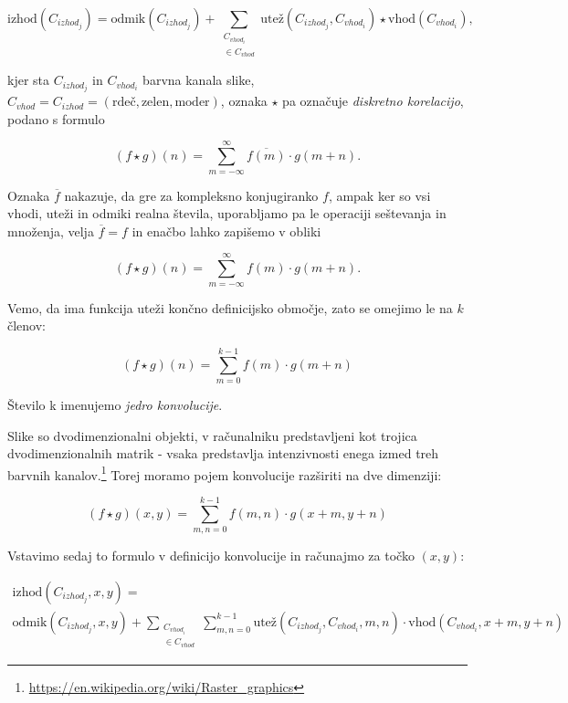 \documentclass[a4paper,11pt,titlepage]{article}
\begin{document}
\begin{equation*}
\text{izhod}(C_{izhod_j}) =
	\text{odmik}(C_{izhod_j}) + \sum_{\substack{C_{vhod_i} \\ \in C_{vhod}}} \text{utež}(C_{izhod_j}, C_{vhod_i}) \star \text{vhod}(C_{vhod_i}) \text{,}
\end{equation*}

kjer sta $C_{izhod_j}$ in $C_{vhod_i}$ barvna kanala slike, $C_{vhod} = C_{izhod} = (\text{rdeč}, \text{zelen}, \text{moder})$,
	oznaka $\star$ pa označuje \emph{diskretno korelacijo}, podano s formulo

\begin{equation*}
(f\star g) (n) = \sum_{m = - \infty}^{\infty} \overline{f(m)} \cdot g(m + n) \text{.}
\end{equation*}

Oznaka $\overline{f}$ nakazuje, da gre za kompleksno konjugiranko $f$, ampak ker so vsi vhodi, uteži in odmiki realna števila,
	uporabljamo pa le operaciji seštevanja in množenja, velja $\overline{f} = f$ in enačbo lahko zapišemo v obliki

\begin{equation*}
(f\star g) (n) = \sum_{m = - \infty}^{\infty} f(m) \cdot g(m + n) \text{.}
\end{equation*}

Vemo, da ima funkcija uteži končno definicijsko območje, zato se omejimo le na $k$ členov:

\begin{equation*}
(f\star g) (n) = \sum_{m = 0}^{k - 1} f(m) \cdot g(m + n)
\end{equation*}

Število k imenujemo \emph{jedro konvolucije}.

Slike so dvodimenzionalni objekti, v računalniku predstavljeni kot trojica dvodimenzionalnih matrik - vsaka predstavlja intenzivnosti
	enega izmed treh barvnih kanalov.\footnote{\url{https://en.wikipedia.org/wiki/Raster\_graphics}}
Torej moramo pojem konvolucije razširiti na dve dimenziji:

\begin{equation*}
(f\star g) (x, y) = \sum_{m, n = 0}^{k - 1} f(m, n) \cdot g(x + m, y + n)
\end{equation*}

Vstavimo sedaj to formulo v definicijo konvolucije in računajmo za točko $(x, y)$:

\begin{multline*}
\text{izhod}(C_{izhod_j}, x, y) = \\
	\text{odmik}(C_{izhod_j}, x, y) + \sum_{\substack{C_{vhod_i} \\ \in C_{vhod}}} \sum_{m, n = 0}^{k - 1}
	\text{utež}(C_{izhod_j}, C_{vhod_i}, m, n) \cdot \text{vhod}(C_{vhod_i}, x + m, y + n)
\end{multline*}
\end{document}
